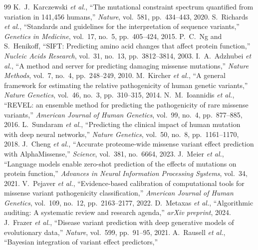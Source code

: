\documentclass[11pt,a4paper]{article}
\theoremstyle{definition}
\begin{document}
\begin{thebibliography}{99}
K.~J.~Karczewski \textit{et al.},
``The mutational constraint spectrum quantified from variation in 141,456 humans,''
\textit{Nature}, vol.~581, pp.~434--443, 2020.
S.~Richards \textit{et al.},
``Standards and guidelines for the interpretation of sequence variants,''
\textit{Genetics in Medicine}, vol.~17, no.~5, pp.~405--424, 2015.
P.~C.~Ng and S.~Henikoff,
``SIFT: Predicting amino acid changes that affect protein function,''
\textit{Nucleic Acids Research}, vol.~31, no.~13, pp.~3812--3814, 2003.
I.~A.~Adzhubei \textit{et al.},
``A method and server for predicting damaging missense mutations,''
\textit{Nature Methods}, vol.~7, no.~4, pp.~248--249, 2010.
M.~Kircher \textit{et al.},
``A general framework for estimating the relative pathogenicity of human genetic variants,''
\textit{Nature Genetics}, vol.~46, no.~3, pp.~310--315, 2014.
N.~M.~Ioannidis \textit{et al.},
``REVEL: an ensemble method for predicting the pathogenicity of rare missense variants,''
\textit{American Journal of Human Genetics}, vol.~99, no.~4, pp.~877--885, 2016.
L.~Sundaram \textit{et al.},
``Predicting the clinical impact of human mutation with deep neural networks,''
\textit{Nature Genetics}, vol.~50, no.~8, pp.~1161--1170, 2018.
J.~Cheng \textit{et al.},
``Accurate proteome-wide missense variant effect prediction with AlphaMissense,''
\textit{Science}, vol.~381, no.~6664, 2023.
J.~Meier \textit{et al.},
``Language models enable zero-shot prediction of the effects of mutations on protein function,''
\textit{Advances in Neural Information Processing Systems}, vol.~34, 2021.
V.~Pejaver \textit{et al.},
``Evidence-based calibration of computational tools for missense variant pathogenicity classification,''
\textit{American Journal of Human Genetics}, vol.~109, no.~12, pp.~2163--2177, 2022.
D.~Metaxas \textit{et al.},
``Algorithmic auditing: A systematic review and research agenda,''
\textit{arXiv preprint}, 2024.
J.~Frazer \textit{et al.},
``Disease variant prediction with deep generative models of evolutionary data,''
\textit{Nature}, vol.~599, pp.~91--95, 2021.
A.~Rausell \textit{et al.},
``Bayesian integration of variant effect predictors,''

\end{thebibliography}
\end{document}
